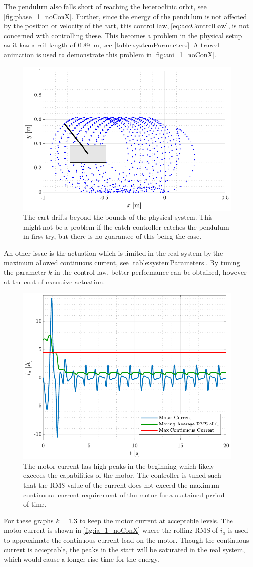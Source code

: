 %
The pendulum also falls short of reaching the heteroclinic orbit, see \autoref{fig:phase_1_noConX}.
Further, since the energy of the pendulum is not affected by the position or velocity of the cart, this control law, \autoref{eq:accControlLaw}, is not concerned with controlling these. This becomes a problem in the physical setup as it has a rail length of \SI{0.89}{m}, see \autoref{table:systemParameters}. A traced animation is used to demonstrate this problem in \autoref{fig:ani_1_noConX}.
\begin{figure}[H]
  \includegraphics[width=.5\textwidth]{figures/ani_1_noConX}
  \caption{The cart drifts beyond the bounds of the physical system. This might not be a problem if the catch controller catches the pendulum in first try, but there is no guarantee of this being the case.}
  \label{fig:ani_1_noConX}
\end{figure}
%
An other issue is the actuation which is limited in the real system by the maximum allowed continuous current, see \autoref{table:systemParameters}. By tuning the parameter $k$ in the control law, better performance can be obtained, however at the cost of excessive actuation.
%
\begin{figure}[H]
  \includegraphics[width=.52\textwidth]{figures/ia_1_noConX}
  \caption{The motor current has high peaks in the beginning which likely exceeds the capabilities of the motor. The controller is tuned such that the RMS value of the current does not exceed the maximum continuous current requirement of the motor for a sustained period of time.}
  \label{fig:ia_1_noConX}
\end{figure}
%
For these graphs $k=1.3$ to keep the motor current at acceptable levels. The motor current is shown in \autoref{fig:ia_1_noConX} where the rolling RMS of $i_a$ is used to approximate the continuous current load on the motor. Though the continuous current is acceptable, the peaks in the start will be saturated in the real system, which would cause a longer rise time for the energy.

